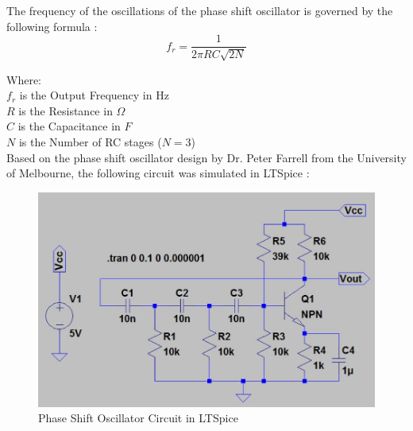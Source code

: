 The frequency of the oscillations of the phase shift oscillator is governed by the following formula \cite{psotutorial}:
\begin{equation}
	f_r = \frac{1}{2 \pi RC \sqrt{2N}}
	\label{frequencyoutput}
\end{equation} 

Where:  \\
$f_r$ is the Output Frequency in Hz \\
$R$ is the Resistance in $\Omega$ \\
$C$ is the Capacitance in $F$ \\
$N$ is the Number of RC stages ($N=3$) \\

Based on the phase shift oscillator design by Dr. Peter Farrell from the University of Melbourne, the following circuit was simulated in LTSpice \cite{peterfarrell}: 

\begin{figure}[H]
	\centering
	\includegraphics[width=0.8\linewidth]{psoltspice.jpg}
	\caption{Phase Shift Oscillator Circuit in LTSpice \cite{peterfarrell}}
	\label{psoltspice}
\end{figure}
